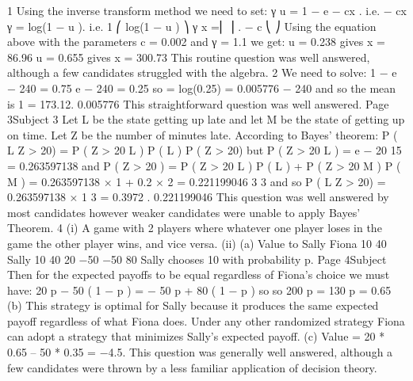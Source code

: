 1
Using the inverse transform method we need to set:
γ
u = 1 − e − cx .
i.e.
− cx γ = log(1 − u ).
i.e.
1
⎛ log(1 − u ) ⎞ γ
x =⎜
⎟ .
− c
⎝
⎠
Using the equation above with the parameters c = 0.002 and γ = 1.1 we get:
u = 0.238 gives x = 86.96
u = 0.655 gives x = 300.73
This routine question was well answered, although a few candidates struggled with the
algebra.
2
We need to solve:
1 − e − 240 \lambda = 0.75
e − 240 \lambda = 0.25
so
\lambda=
log(0.25)
= 0.005776
− 240
and so the mean is
1
= 173.12.
0.005776
This straightforward question was well answered.
Page 3Subject %
3
Let L be the state getting up late and let M be the state of getting up on time.
Let Z be the number of minutes late.
According to Bayes’ theorem:
P ( L Z > 20) =
P ( Z > 20 L ) P ( L )
P ( Z > 20)
but
P ( Z > 20 L ) = e
−
20
15
= 0.263597138
and
P ( Z > 20 ) = P ( Z > 20 L ) P ( L ) + P ( Z > 20 M ) P ( M )
= 0.263597138 × 1 + 0.2 × 2 = 0.221199046
3
3
and so
P ( L Z > 20) =
0.263597138 × 1
3 = 0.3972 .
0.221199046
This question was well answered by most candidates however weaker candidates were unable
to apply Bayes' Theorem.
4
(i) A game with 2 players where whatever one player loses in the game the other
player wins, and vice versa.
(ii) (a)
Value to Sally
Fiona
10
40
Sally
10
40
20
−50
−50 80
Sally chooses 10 with probability p.
Page 4Subject %
Then for the expected payoffs to be equal regardless of Fiona’s choice
we must have:
20 p − 50 ( 1 − p ) = − 50 p + 80 ( 1 − p )
so
so
200 p = 130
p = 0.65
(b) This strategy is optimal for Sally because it produces the same
expected payoff regardless of what Fiona does. Under any other
randomized strategy Fiona can adopt a strategy that minimizes Sally’s
expected payoff.
(c) Value = 20 * 0.65 – 50 * 0.35 = −4.5.
This question was generally well answered, although a few candidates were thrown by a less
familiar application of decision theory.
